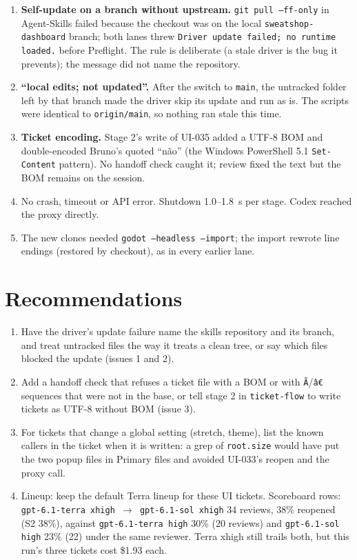 \documentclass[11pt,a4paper]{article}
\begin{document}
\begin{enumerate}
  \item \textbf{Self-update on a branch without upstream.} \texttt{git pull --ff-only} in
        Agent-Skills failed because the checkout was on the local \texttt{sweatshop-dashboard}
        branch; both lanes threw \texttt{Driver update failed; no runtime loaded.} before Preflight.
        The rule is deliberate (a stale driver is the bug it prevents); the message did not name
        the repository.
  \item \textbf{``local edits; not updated''.} After the switch to \texttt{main}, the untracked
         folder left by that branch made the driver skip its update and
        run as is. The scripts were identical to \texttt{origin/main}, so nothing ran stale this
        time.
  \item \textbf{Ticket encoding.} Stage 2's write of UI-035 added a UTF-8 BOM and double-encoded
        Bruno's quoted ``não'' (the Windows PowerShell 5.1 \texttt{Set-Content} pattern). No
        handoff check caught it; review fixed the text but the BOM remains on the session.
  \item No crash, timeout or API error. Shutdown 1.0--1.8~s per stage. Codex reached the proxy
        directly.
  \item The new clones needed \texttt{godot --headless --import}; the import rewrote
         line endings (restored by checkout), as in every
        earlier lane.
\end{enumerate}

\section*{Recommendations}

\begin{enumerate}
  \item Have the driver's update failure name the skills repository and its branch, and treat
        untracked files the way it treats a clean tree, or say which files blocked the update
        (issues 1 and 2).
  \item Add a handoff check that refuses a ticket file with a BOM or with \texttt{Ã}/\texttt{â€}
        sequences that were not in the base, or tell stage 2 in \texttt{ticket-flow} to write
        tickets as UTF-8 without BOM (issue 3).
  \item For tickets that change a global setting (stretch, theme), list the known callers in the
        ticket when it is written: a grep of \texttt{root.size} would have put the two popup files
        in Primary files and avoided UI-033's reopen and the proxy call.
  \item Lineup: keep the default Terra lineup for these UI tickets. Scoreboard rows:
        \texttt{gpt-6.1-terra xhigh $\rightarrow$ gpt-6.1-sol xhigh} 34 reviews, 38\% reopened (S2
        38\%), against \texttt{gpt-6.1-terra high} 30\% (20 reviews) and \texttt{gpt-6.1-sol high}
        23\% (22) under the same reviewer. Terra xhigh still trails both, but this run's three
        tickets cost \$1.93 each.
\end{enumerate}
\end{document}

